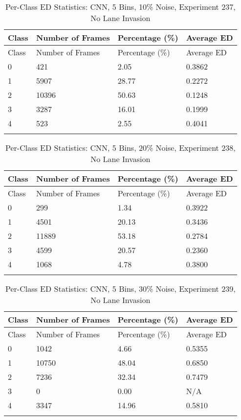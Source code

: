 
\begin{longtable}{@{}llll@{}}
\toprule
Class & Number of Frames & Percentage (\%) & Average ED \\
\midrule
\endfirsthead
\toprule
Class & Number of Frames & Percentage (\%) & Average ED \\
\midrule
\endhead
0 & 421 & 2.05 & 0.3862 \\
1 & 5907 & 28.77 & 0.2272 \\
2 & 10396 & 50.63 & 0.1248 \\
3 & 3287 & 16.01 & 0.1999 \\
4 & 523 & 2.55 & 0.4041 \\
\bottomrule
\caption{Per-Class ED Statistics: CNN, 5 Bins, 10\% Noise, Experiment 237, No Lane Invasion}
\label{tab:exp237_CNN_5bins_10noise}
\end{longtable}
        


\begin{longtable}{@{}llll@{}}
\toprule
Class & Number of Frames & Percentage (\%) & Average ED \\
\midrule
\endfirsthead
\toprule
Class & Number of Frames & Percentage (\%) & Average ED \\
\midrule
\endhead
0 & 299 & 1.34 & 0.3922 \\
1 & 4501 & 20.13 & 0.3436 \\
2 & 11889 & 53.18 & 0.2784 \\
3 & 4599 & 20.57 & 0.2360 \\
4 & 1068 & 4.78 & 0.3800 \\
\bottomrule
\caption{Per-Class ED Statistics: CNN, 5 Bins, 20\% Noise, Experiment 238, No Lane Invasion}
\label{tab:exp238_CNN_5bins_20noise}
\end{longtable}
        


\begin{longtable}{@{}llll@{}}
\toprule
Class & Number of Frames & Percentage (\%) & Average ED \\
\midrule
\endfirsthead
\toprule
Class & Number of Frames & Percentage (\%) & Average ED \\
\midrule
\endhead
0 & 1042 & 4.66 & 0.5355 \\
1 & 10750 & 48.04 & 0.6850 \\
2 & 7236 & 32.34 & 0.7479 \\
3 & 0 & 0.00 & N/A \\
4 & 3347 & 14.96 & 0.5810 \\
\bottomrule
\caption{Per-Class ED Statistics: CNN, 5 Bins, 30\% Noise, Experiment 239, No Lane Invasion}
\label{tab:exp239_CNN_5bins_30noise}
\end{longtable}
        

